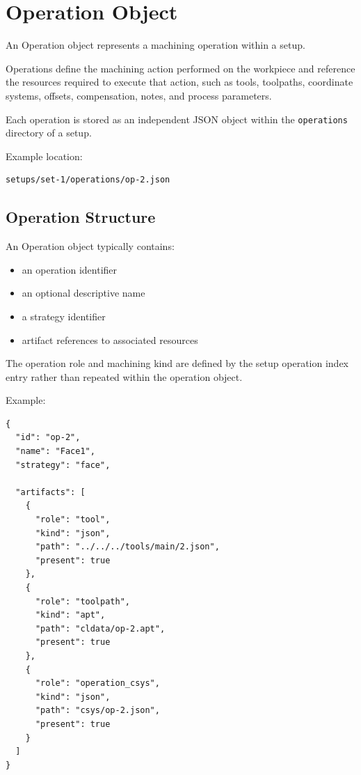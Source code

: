 \section{Operation Object}

An Operation object represents a machining operation within a setup.

Operations define the machining action performed on the workpiece and reference the resources required to execute that action, such as tools, toolpaths, coordinate systems, offsets, compensation, notes, and process parameters.

Each operation is stored as an independent JSON object within the \texttt{operations} directory of a setup.

Example location:

\begin{verbatim}
setups/set-1/operations/op-2.json
\end{verbatim}

\subsection{Operation Structure}

An Operation object typically contains:

\begin{itemize}
\item an operation identifier
\item an optional descriptive name
\item a strategy identifier
\item artifact references to associated resources
\end{itemize}

The operation role and machining kind are defined by the setup operation index entry rather than repeated within the operation object.

Example:

\begin{verbatim}
{
  "id": "op-2",
  "name": "Face1",
  "strategy": "face",

  "artifacts": [
    {
      "role": "tool",
      "kind": "json",
      "path": "../../../tools/main/2.json",
      "present": true
    },
    {
      "role": "toolpath",
      "kind": "apt",
      "path": "cldata/op-2.apt",
      "present": true
    },
    {
      "role": "operation_csys",
      "kind": "json",
      "path": "csys/op-2.json",
      "present": true
    }
  ]
}
\end{verbatim}

